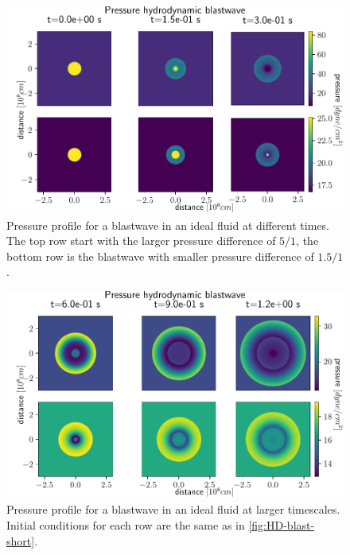 \begin{figure}[h]
	\centering
	\includegraphics[width=\linewidth]{images/HD-blast-prs-1.pdf}
	\caption{Pressure profile for a blastwave in an ideal fluid at different times. The top row start with the larger pressure difference of $5/1$, the bottom row is the blastwave with smaller pressure difference of $1.5/1$.}
	\label{fig:HD-blast-short}
\end{figure}

\begin{figure}[h]
	\centering
	\includegraphics[width=\linewidth]{images/HD-blast-prs-2.pdf}
	\caption{Pressure profile for a blastwave in an ideal fluid at larger timescales. Initial conditions for each row are the same as in \autoref{fig:HD-blast-short}.}
	\label{fig:HD-blast-long}
\end{figure}

